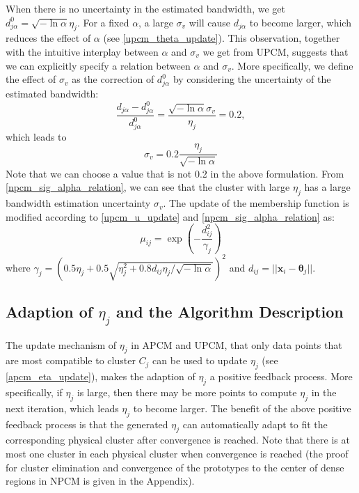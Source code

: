 \documentclass[journal]{IEEEtran}
\theoremstyle{definition}
\begin{document}
When there is no uncertainty in the estimated bandwidth, we get $d_{j\alpha}^0=\sqrt{-\ln\alpha}\eta_j$. For a fixed $\alpha$, a large $\sigma_v$ will cause $d_{j\alpha}$ to become larger, which reduces the effect of $\alpha$ (see \eqref{upcm_theta_update}). This observation, together with the intuitive interplay between $\alpha$ and $\sigma_v$ we get from UPCM, suggests that we can explicitly specify a relation between $\alpha$ and $\sigma_v$. More specifically, we define the effect of $\sigma_v$ as the correction of $d_{j\alpha}^0$ by considering the uncertainty of the estimated bandwidth:
\begin{equation}
\frac{d_{j\alpha}-d_{j\alpha}^0}{d_{j\alpha}^0}=\frac{\sqrt{-\ln\alpha}\sigma_v}{\eta_j}=0.2,
\end{equation}
which leads to 
\begin{equation}
\label{npcm_sig_alpha_relation}
\sigma_v=0.2\frac{\eta_j}{\sqrt{-\ln\alpha}}
\end{equation}
Note that we can choose a value that is not 0.2 in the above formulation. From \eqref{npcm_sig_alpha_relation}, we can see that the cluster with large $\eta_j$ has a large bandwidth estimation uncertainty $\sigma_v$. The update of the membership function is modified according to \eqref{upcm_u_update} and \eqref{npcm_sig_alpha_relation} as:
\begin{equation}
\label{npcm_u_update}
\mu_{ij}=\exp\left(-\frac{d_{ij}^2}{\gamma_j}\right)
\end{equation}
where $\gamma_j=\left(0.5\eta_{j}+0.5\sqrt{\eta_{j}^{2}+0.8d_{ij}\eta_j/\sqrt{-\ln\alpha}}\right)^2$ and $d_{ij}=||\mathbf{x}_i-\boldsymbol{\theta}_j||$.
\subsection{Adaption of $\eta_j$ and the Algorithm Description}
\label{sec-3-4}
The update mechanism of $\eta_j$ in APCM and UPCM, that only data points that are most compatible to cluster $C_j$ can be used to update $\eta_j$ (see \eqref{apcm_eta_update}), makes the adaption of $\eta_j$ a positive feedback process. More specifically, if $\eta_j$ is large, then there may be more points to compute $\eta_j$ in the next iteration, which leads $\eta_j$ to become larger.
The benefit of the above positive feedback process is that the generated $\eta_j$ can automatically adapt to fit the corresponding physical cluster after convergence is reached.
Note that there is at most one cluster in each physical cluster when convergence is reached (the proof for cluster elimination and convergence of the prototypes to the center of dense regions in NPCM is given in the Appendix).
\end{document}

